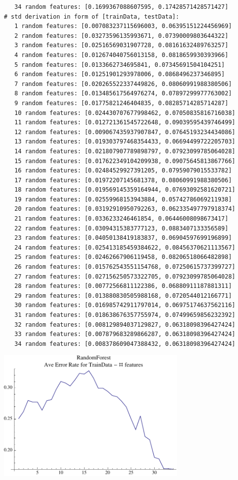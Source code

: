 \documentclass[12pt]{amsart}
\begin{document}
\begin{verbatim}
   34 random features: [0.1699367088607595, 0.17428571428571427]
# std derivation in form of [trainData, testData]:
   1 random features: [0.007083237115696003, 0.06395151224456969]
   2 random features: [0.03273596135993671, 0.07390009803644322]
   3 random features: [0.02516569031907728, 0.08161632489763257]
   4 random features: [0.012674040756013158, 0.0818659930393966]
   5 random features: [0.0133662734695841, 0.07345691504104251]
   6 random features: [0.01251901293978006, 0.0868496237346895]
   7 random features: [0.020265522337449826, 0.08060991988380506]
   8 random features: [0.013485617564976274, 0.07897299977763002]
   9 random features: [0.01775821246404835, 0.08285714285714287]
   10 random features: [0.024430707677998462, 0.07050835816716038]
   11 random features: [0.012721361545722648, 0.09039595439746499]
   12 random features: [0.009067435937907847, 0.07645193234434086]
   13 random features: [0.019303797468354433, 0.06694499722205703]
   14 random features: [0.021807907789898797, 0.07923099785064028]
   15 random features: [0.017622349104209938, 0.09075645813867766]
   16 random features: [0.02484529927391205, 0.07959079015533782]
   17 random features: [0.01972207145681378, 0.08060991988380506]
   18 random features: [0.019569145359164944, 0.07693092581620721]
   19 random features: [0.02559968153943884, 0.05742786069211938]
   20 random features: [0.03192910950792263, 0.062335497797918374]
   21 random features: [0.0336233246461854, 0.06446008098673417]
   22 random features: [0.03094315383777123, 0.0883407133356589]
   23 random features: [0.04050138419183837, 0.06904597699196899]
   24 random features: [0.025413185459384622, 0.08456370621113567]
   25 random features: [0.02462667906119458, 0.08206518066482898]
   26 random features: [0.015762543551154768, 0.07250615737399727]
   27 random features: [0.027156250573322705, 0.07923099785064028]
   28 random features: [0.00772566811122386, 0.06880911187881311]
   29 random features: [0.013880830505988168, 0.0720544012166771]
   30 random features: [0.016985742911797014, 0.06975174637562116]
   31 random features: [0.018638676357755974, 0.07499659856232392]
   32 random features: [0.008129894037129827, 0.06318098396427424]
   33 random features: [0.007879683289866287, 0.06318098396427424]
   34 random features: [0.008378609047388432, 0.06318098396427424]
\end{verbatim}

\begin{center}
\includegraphics[width=0.7\textwidth]{aveErrorTrain.pdf}
\end{center}
\end{document}
